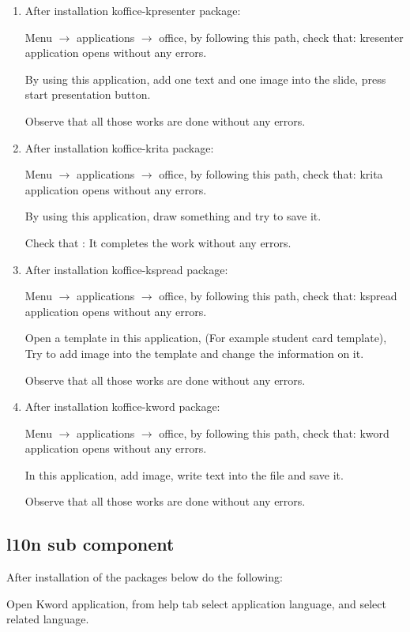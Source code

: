 \documentclass[a4paper,10pt]{article}
\begin{document}
\begin{enumerate}
\item After installation koffice-kpresenter package:

Menu $\rightarrow$ applications $\rightarrow$ office, by following this path, check that: kresenter application opens without any errors.

By using this application, add one text and one image into the slide, press start presentation button.

Observe that all those works are done without any errors.

\item After installation koffice-krita package:

Menu $\rightarrow$ applications $\rightarrow$ office, by following this path, check that: krita application opens without any errors.

By using this application, draw  something and try to save it.

Check that : It completes the work without any errors.

\item After installation koffice-kspread package:

Menu $\rightarrow$ applications $\rightarrow$ office, by following this path, check that: kspread application opens without any errors.

Open a template in this application, (For example student card template), Try to add image into the template and change the information on it.

Observe that all those works are done without any errors.

\item After installation koffice-kword package:

Menu $\rightarrow$ applications $\rightarrow$ office, by following this path, check that: kword application opens without any errors.

In this application, add image, write text into the file and save it.

Observe that all those works are done without any errors.
\end{enumerate}
\subsection*{l10n sub component}
After installation of the packages below do the following: 

Open Kword application, from help tab select application language, and select related language. 
\end{document}
